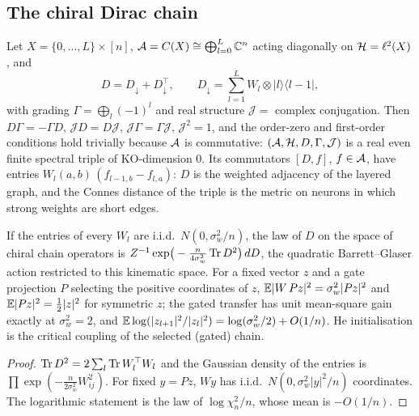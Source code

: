 \label{sec:triple}
\subsection{The chiral Dirac chain}
\begin{definition}\label{def:triple}
Let $X=\{0,\dots,L\}\times[n]$, $\mathcal A=C(X)\cong\bigoplus_{l=0}^L\mathbb C^n$ acting diagonally on $\mathcal H=\ell^2(X)$, and
\[
D=D_\downarrow+D_\downarrow^{\top},\qquad D_\downarrow=\sum_{l=1}^LW_l\otimes|l\rangle\langle l-1|,
\]
with grading $\Gamma=\bigoplus_l(-1)^l$ and real structure $\mathcal J=$ complex conjugation. Then $D\Gamma=-\Gamma D$,
$\mathcal JD=D\mathcal J$, $\mathcal J\Gamma=\Gamma\mathcal J$, $\mathcal J^2=1$, and the order-zero and first-order
conditions hold trivially because $\mathcal A$ is commutative: $(\mathcal A,\mathcal H,D,\Gamma,\mathcal J)$ is a real even finite spectral
triple of KO-dimension $0$. Its commutators $[D,f]$, $f\in\mathcal A$, have entries $W_l(a,b)\,(f_{l-1,b}-f_{l,a})$: $D$ is
the weighted adjacency of the layered graph, and the Connes distance of the triple is the metric on neurons in
which strong weights are short edges.
\end{definition}

\begin{proposition}\label{prop:critical}
If the entries of every $W_l$ are i.i.d.\ $N(0,\sigma_w^2/n)$, the law of $D$ on the space of chiral chain operators is
$Z^{-1}\exp\!\big(-\tfrac{n}{4\sigma_w^2}\operatorname{Tr} D^2\big)\,dD$, the quadratic Barrett--Glaser action \cite{BG,KP} restricted to
this kinematic space. For a fixed vector $z$ and a gate projection $P$ selecting the positive coordinates of $z$,
$\mathbb E|W\,Pz|^2=\sigma_w^2|Pz|^2$ and $\mathbb E|Pz|^2=\tfrac12|z|^2$ for symmetric $z$; the gated transfer has unit
mean-square gain exactly at $\sigma_w^2=2$, and $\mathbb E\log(|z_{l+1}|^2/|z_l|^2)=\log(\sigma_w^2/2)+O(1/n)$. He
initialisation is the critical coupling of the selected (gated) chain.
\end{proposition}
\begin{proof}
$\operatorname{Tr} D^2=2\sum_l\operatorname{Tr} W_l^{\top}W_l$ and the Gaussian density of the entries is $\prod\exp(-\tfrac{n}{2\sigma_w^2}W_{ij}^2)$.
For fixed $y=Pz$, $Wy$ has i.i.d.\ $N(0,\sigma_w^2|y|^2/n)$ coordinates. The logarithmic statement is the law of
$\log\chi^2_n/n$, whose mean is $-O(1/n)$.
\end{proof}

